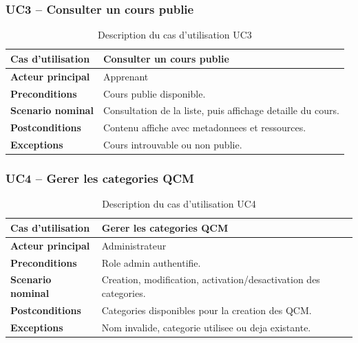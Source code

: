 \documentclass[a4paper,12pt]{report}
\begin{document}
\subsubsection{UC3 -- Consulter un cours publie}
\begin{table}[H]
  \centering
  \caption{Description du cas d'utilisation UC3}
  \begin{tabularx}{\textwidth}{>{\bfseries}p{4cm} X}
    \toprule
    Cas d'utilisation & Consulter un cours publie \\
    \midrule
    Acteur principal & Apprenant \\
    Preconditions & Cours publie disponible. \\
    Scenario nominal & Consultation de la liste, puis affichage detaille du cours. \\
    Postconditions & Contenu affiche avec metadonnees et ressources. \\
    Exceptions & Cours introuvable ou non publie. \\
    \bottomrule
  \end{tabularx}
\end{table}

\subsubsection{UC4 -- Gerer les categories QCM}
\begin{table}[H]
  \centering
  \caption{Description du cas d'utilisation UC4}
  \begin{tabularx}{\textwidth}{>{\bfseries}p{4cm} X}
    \toprule
    Cas d'utilisation & Gerer les categories QCM \\
    \midrule
    Acteur principal & Administrateur \\
    Preconditions & Role admin authentifie. \\
    Scenario nominal & Creation, modification, activation/desactivation des categories. \\
    Postconditions & Categories disponibles pour la creation des QCM. \\
    Exceptions & Nom invalide, categorie utilisee ou deja existante. \\
    \bottomrule
  \end{tabularx}
\end{table}

\end{document}
